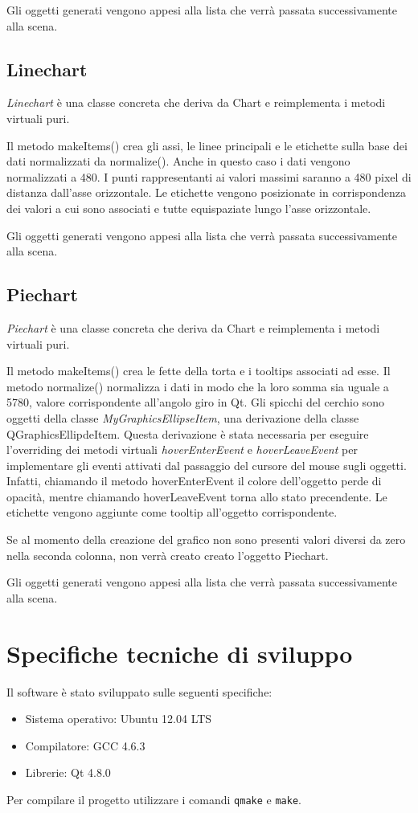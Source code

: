 \documentclass[a4paper,10pt]{article}
\begin{document}
Gli oggetti generati vengono appesi alla lista che verrà passata successivamente alla scena.

\subsection{Linechart}
\emph{Linechart} è una classe concreta che deriva da Chart e reimplementa i metodi virtuali puri.

Il metodo makeItems() crea gli assi, le linee principali e le etichette sulla base dei dati normalizzati da normalize(). Anche in questo caso i dati vengono normalizzati a 480. I punti rappresentanti ai valori massimi saranno a 480 pixel di distanza dall'asse orizzontale. Le etichette vengono posizionate in corrispondenza dei valori a cui sono associati e tutte equispaziate lungo l'asse orizzontale.

Gli oggetti generati vengono appesi alla lista che verrà passata successivamente alla scena.

\subsection{Piechart}
\emph{Piechart} è una classe concreta che deriva da Chart e reimplementa i metodi virtuali puri.

Il metodo makeItems() crea le fette della torta e i tooltips associati ad esse. Il metodo normalize() normalizza i dati in modo che la loro somma sia uguale a 5780, valore corrispondente all'angolo giro in Qt. Gli spicchi del cerchio sono oggetti della classe \emph{MyGraphicsEllipseItem}, una derivazione della classe QGraphicsEllipdeItem. Questa derivazione è stata necessaria per eseguire l'overriding dei metodi virtuali \emph{hoverEnterEvent} e \emph{hoverLeaveEvent} per implementare gli eventi attivati dal passaggio del cursore del mouse sugli oggetti. Infatti, chiamando il metodo hoverEnterEvent il colore dell'oggetto perde di opacità, mentre chiamando hoverLeaveEvent torna allo stato precendente. Le etichette vengono aggiunte come tooltip all'oggetto corrispondente.

Se al momento della creazione del grafico non sono presenti valori diversi da zero nella seconda colonna, non verrà creato creato l'oggetto Piechart.

Gli oggetti generati vengono appesi alla lista che verrà passata successivamente alla scena.

\appendix
\section{Specifiche tecniche di sviluppo}
Il software è stato sviluppato sulle seguenti specifiche:
\begin{itemize}
	\item[]Sistema operativo: Ubuntu 12.04 LTS
	\item[]Compilatore: GCC 4.6.3
	\item[]Librerie: Qt 4.8.0
\end{itemize}
Per compilare il progetto utilizzare i comandi \texttt{qmake} e \texttt{make}.
\end{document}
